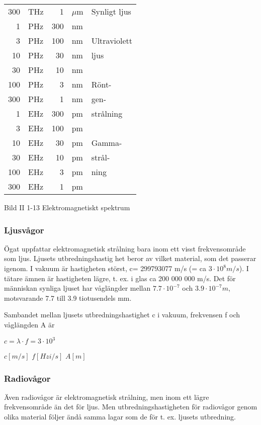 \begin{center}
\begin{tabular}{|rl|rl|l|}
300 & THz &   1 & \(\mu\)m & Synligt ljus \\ \cline{5-5}
  1 & PHz & 300 & nm & \\
  3 & PHz & 100 & nm & Ultraviolett \\
 10 & PHz &  30 & nm & ljus \\ \cline{5-5}
 30 & PHz &  10 & nm & \\
100 & PHz &   3 & nm & Rönt-\\
300 & PHz &   1 & nm & gen-\\
  1 & EHz & 300 & pm & strålning\\ \cline{5-5}
  3 & EHz & 100 & pm & \\
 10 & EHz &  30 & pm & Gamma-\\
 30 & EHz &  10 & pm & strål-\\
100 & EHz &   3 & pm & ning\\
300 & EHz &   1 & pm & \\
\hline
\end{tabular}
\end{center}

Bild II 1-13 Elektromagnetiskt spektrum

\subsubsection{Ljusvågor}

Ögat uppfattar elektromagnetisk strålning bara inom ett visst frekvensområde som ljus.
Ljusets utbredningshastig het beror av vilket material, som det passerar igenom. I
vakuum är hastigheten störst, c= 299793077 m/s (= ca \(3 \cdot 10^8 m/s\)). I tätare ämnen är
hastigheten lägre, t. ex. i glas ca 200 000 000 m/s. Det för människan synliga ljuset har
våglängder mellan \(7.7 \cdot 10^{-7}\) och \(3.9 \cdot 10^{-7} m\), motsvarande 7.7 till 3.9
tiotusendels mm.

Sambandet mellan ljusets utbredningshastighet c i vakuum, frekvensen f och våglängden A är

\(c = \lambda \cdot f = 3 \cdot 10^3\)

\(c [m/s]\) \(f [Hz  i/s]\) \(A [m]\)

\subsubsection{Radiovågor}

Även radiovågor är elektromagnetisk strålning, men inom ett lägre frekvensområde än
det för ljus. Men utbredningshastigheten för radiovågor genom olika material följer ändå
samma lagar som de för t. ex. ljusets utbredning.

